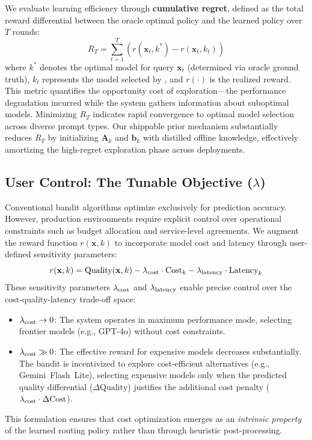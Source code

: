 We evaluate learning efficiency through \textbf{cumulative regret}, defined as the total reward differential between the oracle optimal policy and the learned policy over $T$ rounds:
\begin{equation}
R_T = \sum_{t=1}^T \left( r(\mathbf{x}_t, k^*) - r(\mathbf{x}_t, k_t) \right)
\end{equation}
where $k^*$ denotes the optimal model for query $\mathbf{x}_t$ (determined via oracle ground truth), $k_t$ represents the model selected by \ours{}, and $r(\cdot)$ is the realized reward. This metric quantifies the opportunity cost of exploration---the performance degradation incurred while the system gathers information about suboptimal models. Minimizing $R_T$ indicates rapid convergence to optimal model selection across diverse prompt types. Our shippable prior mechanism substantially reduces $R_T$ by initializing $\mathbf{A}_k$ and $\mathbf{b}_k$ with distilled offline knowledge, effectively amortizing the high-regret exploration phase across deployments.

\subsection{User Control: The Tunable Objective ($\lambda$)}
\label{sec:lambda}

Conventional bandit algorithms optimize exclusively for prediction accuracy. However, production environments require explicit control over operational constraints such as budget allocation and service-level agreements. We augment the reward function $r(\mathbf{x}, k)$ to incorporate model cost and latency through user-defined sensitivity parameters:
\begin{equation}
r(\mathbf{x}, k) = \text{Quality}(\mathbf{x}, k) - \lambda_{\text{cost}} \cdot \text{Cost}_k - \lambda_{\text{latency}} \cdot \text{Latency}_k
\end{equation}
These sensitivity parameters $\lambda_{\text{cost}}$ and $\lambda_{\text{latency}}$ enable precise control over the cost-quality-latency trade-off space:
\begin{itemize}[leftmargin=*,nosep]
    \item $\lambda_{\text{cost}} \to 0$: The system operates in maximum performance mode, selecting frontier models (e.g., GPT-4o) without cost constraints.
    \item $\lambda_{\text{cost}} \gg 0$: The effective reward for expensive models decreases substantially. The bandit is incentivized to explore cost-efficient alternatives (e.g., Gemini~Flash~Lite), selecting expensive models only when the predicted quality differential ($\Delta\text{Quality}$) justifies the additional cost penalty ($\lambda_{\text{cost}} \cdot \Delta\text{Cost}$).
\end{itemize}
This formulation ensures that cost optimization emerges as an \emph{intrinsic property} of the learned routing policy rather than through heuristic post-processing.

